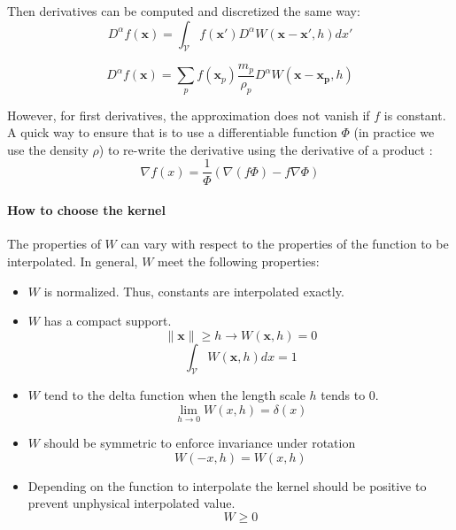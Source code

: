 Then derivatives can be computed and discretized the same way:
\begin{equation}
D^{\alpha} f(\mathbf{x}) = \int_{\mathcal{V}} f(\mathbf{x'}) D^{\alpha} W(\mathbf{x}-\mathbf{x'}, h)dx'
\end{equation}

\begin{equation}
D^{\alpha} f(\mathbf{x})= \sum_{p} f(\mathbf{x}_{p})\frac{m_{p}}{\rho_{p}} D^{\alpha} W(\mathbf{x}-\mathbf{x_{p}},h)
\end{equation}

However, for first derivatives, the approximation does not vanish if $f$ is constant. A quick way to ensure that is to use a differentiable function $\Phi$ (in practice we use the density $\rho$) to re-write the derivative using the derivative of a product :
\begin{equation}
\nabla f(x) = \frac{1}{\Phi}\left(\nabla (f \Phi) - f \nabla \Phi \right)
\end{equation}

\paragraph{How to choose the kernel}
The properties of $W$ can vary with respect to the properties of the function to be interpolated. In general, $W$ meet the following properties:
\begin{itemize}
\item $W$ is normalized. Thus, constants are interpolated exactly.
\item $W$ has a compact support.
\begin{equation}
\parallel \mathbf{x} \parallel \geq h \rightarrow W(\mathbf{x},h) = 0 
\end{equation}
\begin{equation}
\int_{\mathcal{V}} W(\mathbf{x},h) dx = 1
\end{equation}
\item $W$ tend to the delta function when the length scale $h$ tends to $0$.
\begin{equation}
\lim_{h \rightarrow 0} W(x,h) = \delta(x)
\end{equation}
\item $W$ should be symmetric to enforce invariance under rotation
\begin{equation}
W(-x,h) = W(x,h)
\end{equation}
\item Depending on the function to interpolate the kernel should be positive to prevent unphysical interpolated value.
\begin{equation}
W \geq 0
\end{equation}
\end{itemize}

